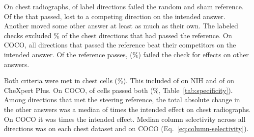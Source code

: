 \begin{table}[pos=t]
\centering
\caption{\textbf{Ownership and direction specificity.} Counts of checkpoint--concept pairs. Each of the last three columns requires the steering reference to be met.}
\label{tab:specificity}
\setlength{\tabcolsep}{3pt}
\end{table}

On chest radiographs, \cfChestRefBelow{} of \cfChestCellsN{} label directions failed the random and sham reference. Of the \jnRefChest{} that passed, \jnRefLostChest{} lost to a competing direction on the intended answer. Another \jnOwnedNotColChest{} moved some other answer at least as much as their own. The labeled checks excluded \jnRefNotTwoWayChestPct{}\% of the chest directions that had passed the reference. On COCO, all directions that passed the reference beat their competitors on the intended answer. Of the \jnRefCoco{} reference passes, \jnOwnedNotColCoco{} (\jnRefNotTwoWayCocoPct{}\%) failed the check for effects on other answers.

Both criteria were met in \jnTwoWayChest{} chest cells (\jnTwoWayChestPct{}\%). This included \jnTwoWayNih{} of \cfNihCells{} on NIH and \jnTwoWayChex{} of \cfChexCells{} on CheXpert Plus. On COCO, \jnTwoWayCoco{} of \cfCocoCells{} cells passed both (\jnTwoWayCocoPct{}\%, Table~\ref{tab:specificity}). Among directions that met the steering reference, the total absolute change in the other answers was a median of \jnOffTargetChest{} times the intended effect on chest radiographs. On COCO it was \jnOffTargetCoco{} times the intended effect. Median column selectivity across all directions was \jnKappaMedChest{} on each chest dataset and \jnKappaMedCoco{} on COCO (Eq.~\ref{eq:column-selectivity}).

